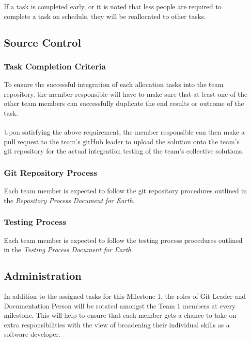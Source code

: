 \documentclass[10pt,a4,oneside]{article}
\begin{document}
If a task is completed early, or it is noted that less people are required to complete a task on schedule, they will be reallocated to other tasks.\\
 

\subsection{Source Control}

\subsubsection{Task Completion Criteria}

\noindent To ensure the successful integration of each allocation tasks into the team repository, the member responsible will have to make sure that at least one of the other team members can successfully duplicate the end results or outcome of the task.

\paragraph{}
\noindent Upon satisfying the above requirement, the member responsible can then make a pull request to the team's gitHub leader to upload the solution onto the team's git repository for the actual integration testing of the team's collective solutions. 


\subsubsection{Git Repository Process}

\noindent Each team member is expected to follow the git repository procedures outlined in the \emph{Repository Process Document for Earth}.
 

\subsubsection{Testing Process}
\noindent Each team member is expected to follow the testing process procedures outlined in the \emph{Testing Process Document for Earth}.


\subsection{Administration}

In addition to the assigned tasks for this Milestone 1, the roles of Git Leader and Documentation Person will be rotated amongst the Team 1 members at every milestone. This will help to ensure that each member gets a chance to take on extra responsibilities with the view of broadening their individual skills as a software developer.
\end{document}
